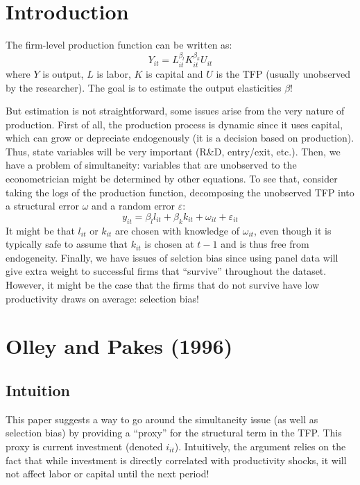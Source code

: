 \section{Introduction}

The firm-level production function can be written as: $$Y_{it} = L_{it}^{\beta_l} K_{it}^{\beta_k} U_{it} $$ where $Y$ is output, $L$ is labor, $K$ is capital and $U$ is the TFP (usually unobserved by the researcher). The goal is to estimate the output elasticities $\beta$!

But estimation is not straightforward, some issues arise from the very nature of production. First of all, the production process is dynamic since it uses capital, which can grow or depreciate endogenously (it is a decision based on production). Thus, state variables will be very important (R\&D, entry/exit, etc.). Then, we have a problem of simultaneity: variables that are unobserved to the econometrician might be determined by other equations. To see that, consider taking the logs of the production function, decomposing the unobserved TFP into a structural error $\omega$ and a random error $\varepsilon$: $$ y_{it} = \beta_l l_{it} +  \beta_k k_{it} + \omega_{it} + \varepsilon_{it} $$ It might be that $l_{it}$ or $k_{it}$ are chosen with knowledge of $\omega_{it}$, even though it is typically safe to assume that $k_{it}$ is chosen at $t-1$ and is thus free from endogeneity. Finally, we have issues of selction bias since using panel data will give extra weight to successful firms that ``survive'' throughout the dataset. However, it might be the case that the firms that do not survive have low productivity draws on average: selection bias!

\section{Olley and Pakes (1996)}

\subsection{Intuition}

This paper suggests a way to go around the simultaneity issue (as well as selection bias) by providing a ``proxy'' for the structural term in the TFP. This proxy is current investment (denoted $i_{it}$). Intuitively, the argument relies on the fact that while investment is directly correlated with productivity shocks, it will not affect labor or capital until the next period!

